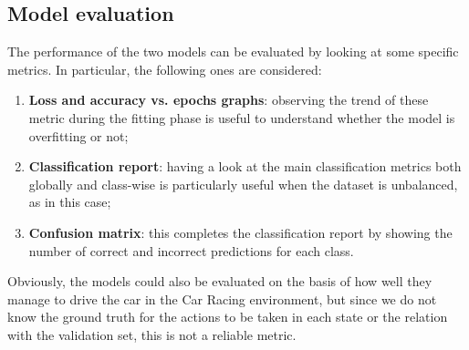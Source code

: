 \subsection{Model evaluation}
The performance of the two models can be evaluated by looking at some specific metrics. In particular, the following ones are considered:
\begin{enumerate}
    \item \textbf{Loss and accuracy vs. epochs graphs}: observing the trend of these metric during the fitting phase is useful to understand whether the model is overfitting or not;
    \item \textbf{Classification report}: having a look at the main classification metrics both globally and class-wise is particularly useful when the dataset is unbalanced, as in this case;
    \item \textbf{Confusion matrix}: this completes the classification report by showing the number of correct and incorrect predictions for each class.
\end{enumerate}
Obviously, the models could also be evaluated on the basis of how well they manage to drive the car in the Car Racing environment, but since we do not know the ground truth for the actions to be taken in each state or the relation with the validation set, this is not a reliable metric.